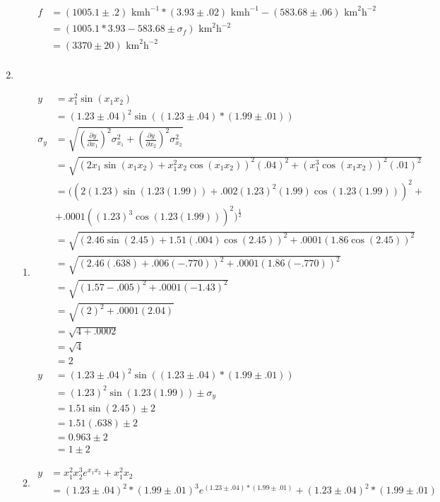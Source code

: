 \documentclass{article}
\begin{document}
\begin{enumerate}
\begin{enumerate}
\begin{align*}
f &= (1005.1 \pm .2)\text{ kmh}^{-1} * (3.93 \pm .02)\text{ kmh}^{-1} - (583.68 \pm .06)\text{ km}^2\text{h}^{-2}\\
&= (1005.1 * 3.93 - 583.68 \pm \sigma_{f})\text{ km}^2\text{h}^{-2}\\
&= (3370 \pm 20)\text{ km}^2\text{h}^{-2}\\
\end{align*}
\end{enumerate}
\item
\begin{enumerate}
\item
\begin{align*}
y &= x_1^2\sin(x_1x_2)\\
&= (1.23 \pm .04)^2\sin((1.23 \pm .04) * (1.99 \pm .01))\\
\sigma_{y} &= \sqrt{(\frac{\partial y}{\partial x_1})^2\sigma_{x_1}^2 + (\frac{\partial y}{\partial x_2})^2\sigma_{x_2}^2}\\
&= \sqrt{(2x_1\sin(x_1x_2) + x_1^2x_2\cos(x_1x_2))^2(.04)^2 + (x_1^3\cos(x_1x_2))^2(.01)^2}\\
&= ((2(1.23)\sin(1.23(1.99)) + .002(1.23)^2(1.99)\cos(1.23(1.99)))^2 +\\
&+ .0001((1.23)^3\cos(1.23(1.99)))^2)^\frac12\\
&= \sqrt{(2.46\sin(2.45) + 1.51(.004)\cos(2.45))^2 + .0001(1.86\cos(2.45))^2}\\
&= \sqrt{(2.46(.638) + .006(-.770))^2 + .0001(1.86(-.770))^2}\\
&= \sqrt{(1.57 - .005)^2 + .0001(-1.43)^2}\\
&= \sqrt{(2)^2 + .0001(2.04)}\\
&= \sqrt{4 + .0002}\\
&= \sqrt{4}\\
&= 2\\
y &= (1.23 \pm .04)^2\sin((1.23 \pm .04) * (1.99 \pm .01))\\
&= (1.23)^2\sin(1.23(1.99)) \pm \sigma_{y}\\
&= 1.51\sin(2.45) \pm 2\\
&= 1.51(.638) \pm 2\\
&= 0.963 \pm 2\\
&= 1 \pm 2
\end{align*}
\item
\begin{align*}
y &= x_1^2x_2^3e^{x_1x_2} + x_1^2x_2\\
&= (1.23 \pm .04)^2 * (1.99 \pm .01)^3e^{(1.23 \pm .04) * (1.99 \pm .01)} + (1.23 \pm .04)^2 * (1.99 \pm .01)\\

\end{align*}
\end{enumerate}
\end{enumerate}
\end{document}
